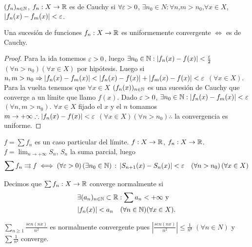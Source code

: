 \begin{definition}
  \((f_n)_{n \in \mathbb{N}}\), \(f_n: X \to \mathbb{R}\) es de Cauchy si \(\forall \varepsilon > 0\), \(\exists n_0 \in N : \forall n\),\(m > n_0\),\(\forall x \in X\), \(|f_n(x) - f_m(x)| < \varepsilon\).
\end{definition}

\begin{theorem}
  Una sucesión de funciones \(f_n : X \to \mathbb{R}\) es uniformemente convergente \(\iff\) es de Cauchy.
  \begin{proof}
    Para la ida tomemos \(\varepsilon > 0\), luego \(\exists n_0 \in \mathbb{N} : |f_n(x) - f(x)| < \frac{\varepsilon}{2}\) \((\forall n > n_0)(\forall x \in X)\) por hipótesis. Luego si \(n, m > n_0 \Rightarrow |f_n(x) - f_m(x)| < |f_n(x) - f(x)| + |f_m(x) - f(x)| < \varepsilon\) \((\forall x \in X)\). \\
    Para la vuelta tenemos que \(\forall x \in X\) \((f_n(x))_{n \in \mathbb{N}}\) es una sucesión de Cauchy que converge a un límite que llamo \(f(x)\). Dado \(\varepsilon > 0\), \(\exists n_0 \in \mathbb{N} : |f_n(x) - f_m(x)| < \varepsilon\) \((\forall n, m > n_0)\). \(\forall x \in X\) fijado el \(x\) y el \(n\) tomamos \(m \to +\infty \therefore |f_n(x) - f(x)| < \varepsilon\) \((\forall x \in X)(\forall n > n_0) \therefore\) la convergencia es uniforme.
  \end{proof}
\end{theorem}

\(f = \sum f_n\) es un caso particular del límite.
\(f : X \to \mathbb{R}\), \(f_n: X \to \mathbb{R}\). \(f = \lim_{n \to +\infty} S_n\), \(S_n\) la suma parcial, luego
\begin{align*}
  \sum f_n \rightrightarrows f \iff (\forall \varepsilon > 0) \, (\exists n_0 \in \mathbb{N}) \, : \, |S_{n+1}(x) - S_n(x)| < \varepsilon \quad (\forall n > n_0) \, (\forall x \in X)
\end{align*}

\begin{definition}
  Decimos que \(\sum f_n: X \to \mathbb{R}\) converge normalmente si
  \begin{align*}
     & \exists (a_n)_{n \in \mathbb{N}} \subset \mathbb{R} : \sum a_n < +\infty \text{ y } \\
     & |f_n(x)| < a_n \quad (\forall n \in \mathbb{N})(\forall x \in X).
  \end{align*}
\end{definition}

\begin{eg}
  \(\sum_{n \geq 1} \frac{sen(nx)}{n^2}\) es normalmente convergente pues \(|\frac{sen(nx)}{n^2}| \leq \frac{1}{n²}\) \((\forall n \in N)\) y \(\sum \frac{1}{n²}\) converge.
\end{eg}

